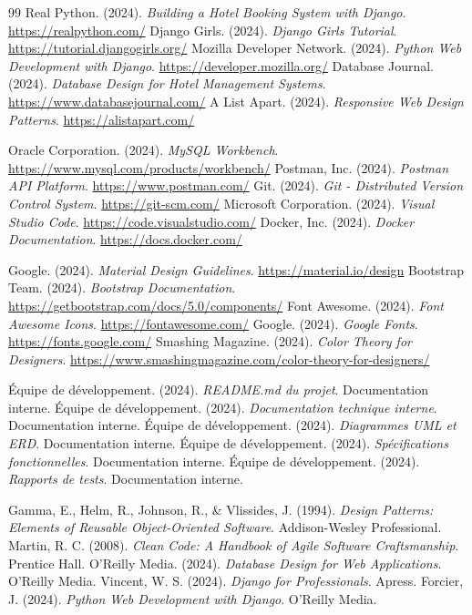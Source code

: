\documentclass[12pt,a4paper]{report}
\begin{document}
\begin{thebibliography}{99}
 Real Python. (2024). \textit{Building a Hotel Booking System with Django}. \url{https://realpython.com/}
 Django Girls. (2024). \textit{Django Girls Tutorial}. \url{https://tutorial.djangogirls.org/}
 Mozilla Developer Network. (2024). \textit{Python Web Development with Django}. \url{https://developer.mozilla.org/}
 Database Journal. (2024). \textit{Database Design for Hotel Management Systems}. \url{https://www.databasejournal.com/}
 A List Apart. (2024). \textit{Responsive Web Design Patterns}. \url{https://alistapart.com/}

 Oracle Corporation. (2024). \textit{MySQL Workbench}. \url{https://www.mysql.com/products/workbench/}
 Postman, Inc. (2024). \textit{Postman API Platform}. \url{https://www.postman.com/}
 Git. (2024). \textit{Git - Distributed Version Control System}. \url{https://git-scm.com/}
 Microsoft Corporation. (2024). \textit{Visual Studio Code}. \url{https://code.visualstudio.com/}
 Docker, Inc. (2024). \textit{Docker Documentation}. \url{https://docs.docker.com/}

 Google. (2024). \textit{Material Design Guidelines}. \url{https://material.io/design}
 Bootstrap Team. (2024). \textit{Bootstrap Documentation}. \url{https://getbootstrap.com/docs/5.0/components/}
 Font Awesome. (2024). \textit{Font Awesome Icons}. \url{https://fontawesome.com/}
 Google. (2024). \textit{Google Fonts}. \url{https://fonts.google.com/}
 Smashing Magazine. (2024). \textit{Color Theory for Designers}. \url{https://www.smashingmagazine.com/color-theory-for-designers/}

 Équipe de développement. (2024). \textit{README.md du projet}. Documentation interne.
 Équipe de développement. (2024). \textit{Documentation technique interne}. Documentation interne.
 Équipe de développement. (2024). \textit{Diagrammes UML et ERD}. Documentation interne.
 Équipe de développement. (2024). \textit{Spécifications fonctionnelles}. Documentation interne.
 Équipe de développement. (2024). \textit{Rapports de tests}. Documentation interne.

 Gamma, E., Helm, R., Johnson, R., \& Vlissides, J. (1994). \textit{Design Patterns: Elements of Reusable Object-Oriented Software}. Addison-Wesley Professional.
 Martin, R. C. (2008). \textit{Clean Code: A Handbook of Agile Software Craftsmanship}. Prentice Hall.
 O'Reilly Media. (2024). \textit{Database Design for Web Applications}. O'Reilly Media.
 Vincent, W. S. (2024). \textit{Django for Professionals}. Apress.
 Forcier, J. (2024). \textit{Python Web Development with Django}. O'Reilly Media.


\end{thebibliography}
\end{document}
